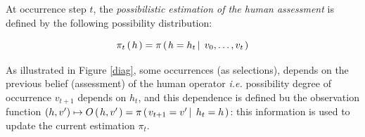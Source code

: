 At occurrence step $t$, 
the \emph{possibilistic estimation of the human assessment} 
is defined by the following possibility distribution:
\begin{Def}
\begin{equation}
\label{estimH}
\pi_{t} \left( \left.  h  \right. \right) = \pi \left( \left.  h = h_t \, \right| \left. \, v_0, \ldots, v_t   \right. \right)
\end{equation}
\end{Def}

As illustrated in Figure \ref{diag}, 
some occurrences (as selections), depends on the previous belief (assessment) of the human
operator \textit{i.e.} possibility degree of occurrence $v_{t+1}$ depends on $h_t$,
and this dependence is defined bu the observation function 
$(h,v') \mapsto O \left( \left. h,v' \right. \right) = \pi \left( \left.  v_{t+1}=v' \, \right| \left. \, h_t=h  \right. \right)$:
this information is used to update the current estimation $\pi_t$.

